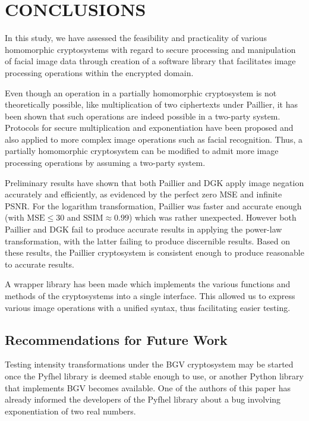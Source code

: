 \chapter{CONCLUSIONS}
In this study, we have assessed the feasibility and practicality of various homomorphic cryptosystems with regard to secure processing and manipulation of facial image data through creation of a software library that facilitates image processing operations within the encrypted domain.

Even though an operation in a partially homomorphic cryptosystem is not theoretically possible, like multiplication of two ciphertexts under Paillier, it has been shown that such operations are indeed possible in a two-party system. Protocols for secure multiplication and exponentiation have been proposed and also applied to more complex image operations such as facial recognition. Thus, a partially homomorphic cryptosystem can be modified to admit more image processing operations by assuming a two-party system.

Preliminary results have shown that both Paillier and DGK apply image negation accurately and efficiently, as evidenced by the perfect zero MSE and infinite PSNR. For the logarithm transformation, Paillier was faster and accurate enough (with $\text{MSE} \le 30$ and $\text{SSIM} \approx 0.99$) which was rather unexpected. However both Paillier and DGK fail to produce accurate results in applying the power-law transformation, with the latter failing to produce discernible results. Based on these results, the Paillier cryptosystem is consistent enough to produce reasonable to accurate results.

A wrapper library has been made which implements the various functions and methods of the cryptosystems into a single interface. This allowed us to express various image operations with a unified syntax, thus facilitating easier testing.

\section{Recommendations for Future Work}
Testing intensity transformations under the BGV cryptosystem may be started once the Pyfhel library is deemed stable enough to use, or another Python library that implements BGV becomes available.
One of the authors of this paper has already informed the developers of the Pyfhel library about a bug involving exponentiation of two real numbers.


